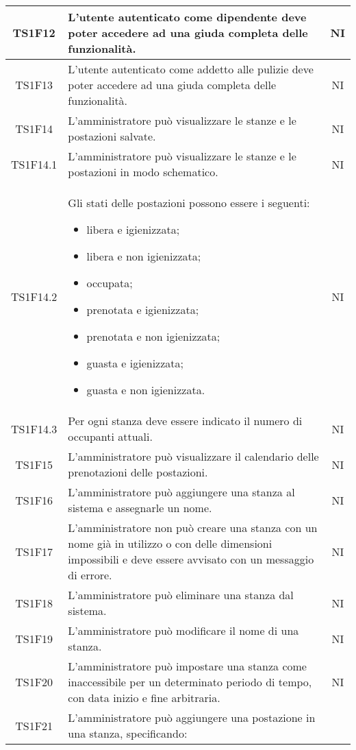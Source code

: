 \begin{center}
\begin{longtable}{|c|p{10cm}|c|}
			\hline
			TS1F12 & L'utente autenticato come dipendente deve poter accedere ad una giuda completa delle funzionalità. & NI \\			
			\hline
			TS1F13 & L'utente autenticato come addetto alle pulizie deve poter accedere ad una giuda completa delle funzionalità. & NI \\
			\hline
			TS1F14 & L'amministratore può visualizzare le stanze e le postazioni salvate. & NI \\			
			\hline
			TS1F14.1 & L'amministratore può visualizzare le stanze e le postazioni in modo schematico. & NI \\			
			\hline
			TS1F14.2 & Gli stati delle postazioni possono essere i seguenti:
			 \begin{itemize}
			 	\item libera e igienizzata;
			 	\item libera e non igienizzata;
			 	\item occupata;
			 	\item prenotata e igienizzata;
			 	\item prenotata e non igienizzata;
			 	\item guasta e igienizzata;
			 	\item guasta e non igienizzata.
			 \end{itemize}
			 & NI \\			
			\hline
			TS1F14.3 & Per ogni stanza deve essere indicato il numero di occupanti attuali. & NI \\			
			\hline
			TS1F15 & L'amministratore può visualizzare il calendario delle prenotazioni delle postazioni. & NI \\			
			\hline
			TS1F16 & L'amministratore può aggiungere una stanza al sistema e assegnarle un nome. & NI \\			
			\hline
			TS1F17 & L'amministratore non può creare una stanza con un nome già in utilizzo o con delle dimensioni impossibili e deve essere avvisato con un messaggio di errore. & NI \\			
			\hline
			TS1F18 & L'amministratore può eliminare una stanza dal sistema. & NI \\			
			\hline
			TS1F19 & L'amministratore può modificare il nome di una stanza. & NI \\			
			\hline
			TS1F20 & L'amministratore può impostare una stanza come inaccessibile per un determinato periodo di tempo, con data inizio e fine arbitraria. & NI \\			
			\hline
			TS1F21 & L'amministratore può aggiungere una postazione in una stanza, specificando:

\end{longtable}
\end{center}

